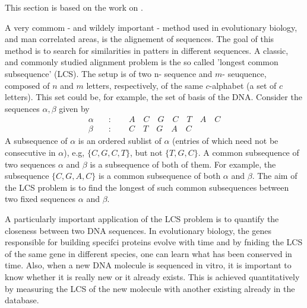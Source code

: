 
This section is based on the work on \cite{majumdar2007randommatricesulamproblem}.

A very commom - and wildely important - method used in evolutionary biology, and man correlated areas, is the alignement of sequences. The goal of this method is to search for similarities in patters in different sequences. A classic, and commonly studied alignment problem is the so called 'longest common subsequence' (LCS). The setup is of two n- sequence and $m$- seuquence, composed of $n$ and $m$ letters, respectively, of the same $c$-alphabet (a set of $c$ letters).  This set could be, for example, the set of basis of the DNA.  Consider the sequences $\alpha, \beta$ given by
\begin{align*}
	\alpha \quad & : \qquad A \quad C \quad G \quad C \quad T \quad A \quad C \\
	\beta \quad & : \qquad C \quad T \quad G \quad A \quad C
\end{align*}
A subsequence of $\alpha$ is an ordered sublist of $\alpha$ (entries of which need not be consecutive in $\alpha$), e.g, $\{C, G, C, T\}$, but not $\{T, G, C\}$. A common subsequence of two sequences $\alpha$ and $\beta$ is a subsequence of both of them. For example, the subsequence $\{C, G, A, C\}$ is a common subsequence of both $\alpha$ and $\beta$. The aim of the LCS problem is to find the longest of such common subsequences between two fixed sequences $\alpha$ and $\beta$. 

A particularly important application of the LCS problem is to quantify the closeness between two DNA sequences. In evolutionary biology, the genes responsible for building specifci proteins evolve with time and by fniding the LCS of the same gene in different species, one can learn what has been conserved in time. Also, when a new DNA molecule is sequenced in vitro, it is important to know whether it is really new or it already exists. This is achieved quantitatively by measuring the LCS of the new molecule with another existing already in the database. 

